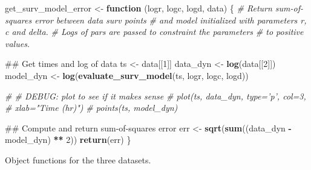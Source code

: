 \documentclass[]{article}
\newenvironment{Shaded}{\begin{snugshade}}{\end{snugshade}}
\newcommand{\KeywordTok}[1]{\textcolor[rgb]{0.13,0.29,0.53}{\textbf{#1}}}
\newcommand{\DecValTok}[1]{\textcolor[rgb]{0.00,0.00,0.81}{#1}}
\newcommand{\StringTok}[1]{\textcolor[rgb]{0.31,0.60,0.02}{#1}}
\newcommand{\CommentTok}[1]{\textcolor[rgb]{0.56,0.35,0.01}{\textit{#1}}}
\newcommand{\ControlFlowTok}[1]{\textcolor[rgb]{0.13,0.29,0.53}{\textbf{#1}}}
\newcommand{\OperatorTok}[1]{\textcolor[rgb]{0.81,0.36,0.00}{\textbf{#1}}}
\newcommand{\NormalTok}[1]{#1}
\begin{document}
\begin{Shaded}
\begin{Highlighting}[]
\NormalTok{get_surv_model_error <-}\StringTok{ }\ControlFlowTok{function}\NormalTok{ (logr, logc, logd, data) \{}
  \CommentTok{# Return sum-of-squares error between data surv points }
  \CommentTok{# and model initialized with parameters r, c and delta.}
  \CommentTok{# Logs of pars are passed to constraint the parameters}
  \CommentTok{# to positive values.}
  
\NormalTok{  ## Get times and log of data}
\NormalTok{  ts <-}\StringTok{ }\NormalTok{data[[}\DecValTok{1}\NormalTok{]]}
\NormalTok{  data_dyn <-}\StringTok{ }\KeywordTok{log}\NormalTok{(data[[}\DecValTok{2}\NormalTok{]])}
\NormalTok{  model_dyn <-}\StringTok{ }\KeywordTok{log}\NormalTok{(}\KeywordTok{evaluate_surv_model}\NormalTok{(ts, logr, logc, logd))}
  
  \CommentTok{# # DEBUG: plot to see if it makes sense}
  \CommentTok{# plot(ts, data_dyn, type='p', col=3,}
  \CommentTok{#    xlab="Time (hr)")}
  \CommentTok{# points(ts, model_dyn)}

\NormalTok{  ## Compute and return sum-of-squares error}
\NormalTok{  err <-}\StringTok{ }\KeywordTok{sqrt}\NormalTok{(}\KeywordTok{sum}\NormalTok{((data_dyn }\OperatorTok{-}\StringTok{ }\NormalTok{model_dyn) }\OperatorTok{**}\StringTok{ }\DecValTok{2}\NormalTok{))}
  \KeywordTok{return}\NormalTok{(err)}
\NormalTok{\}}
\end{Highlighting}
\end{Shaded}

Object functions for the three datasets.
\end{document}
